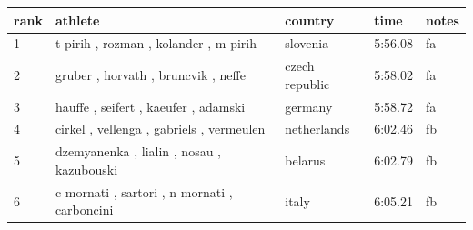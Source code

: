 \documentclass{article}
\begin{document}
\begin{tabular}{lllll}
\toprule
rank & athlete & country & time & notes \\
\midrule
1 & t pirih , rozman , kolander , m pirih & slovenia & 5:56.08 & fa \\
2 & gruber , horvath , bruncvik , neffe & czech republic & 5:58.02 & fa \\
3 & hauffe , seifert , kaeufer , adamski & germany & 5:58.72 & fa \\
4 & cirkel , vellenga , gabriels , vermeulen & netherlands & 6:02.46 & fb \\
5 & dzemyanenka , lialin , nosau , kazubouski & belarus & 6:02.79 & fb \\
6 & c mornati , sartori , n mornati , carboncini & italy & 6:05.21 & fb \\
\bottomrule
\end{tabular}
\end{document}
